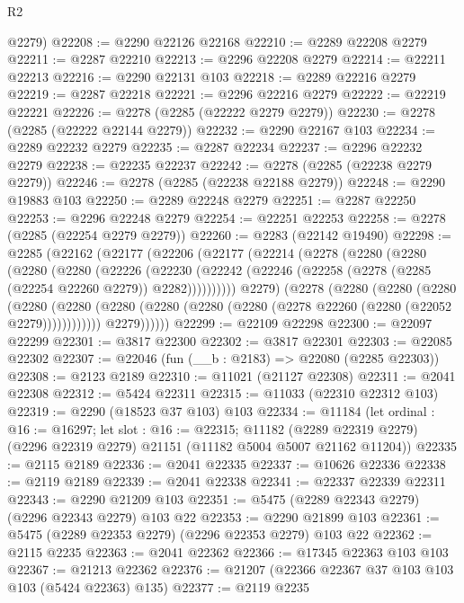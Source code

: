 \begin{lexlean}{R2}
\begin{coremodule}
      @2279)
@22208 := @2290 @22126 @22168
@22210 := @2289 @22208 @2279
@22211 := @2287 @22210
@22213 := @2296 @22208 @2279
@22214 := @22211 @22213
@22216 := @2290 @22131 @103
@22218 := @2289 @22216 @2279
@22219 := @2287 @22218
@22221 := @2296 @22216 @2279
@22222 := @22219 @22221
@22226 := @2278 (@2285 (@22222 @2279 @2279))
@22230 := @2278 (@2285 (@22222 @22144 @2279))
@22232 := @2290 @22167 @103
@22234 := @2289 @22232 @2279
@22235 := @2287 @22234
@22237 := @2296 @22232 @2279
@22238 := @22235 @22237
@22242 := @2278 (@2285 (@22238 @2279 @2279))
@22246 := @2278 (@2285 (@22238 @22188 @2279))
@22248 := @2290 @19883 @103
@22250 := @2289 @22248 @2279
@22251 := @2287 @22250
@22253 := @2296 @22248 @2279
@22254 := @22251 @22253
@22258 := @2278 (@2285 (@22254 @2279 @2279))
@22260 := @2283 (@22142 @19490)
@22298 := @2285
    (@22162
      (@22177
        (@22206
          (@22177
            (@22214
              (@2278
                (@2280
                  (@2280
                    (@2280
                      (@2280
                        (@22226
                          (@22230
                            (@22242
                              (@22246 (@22258 (@2278 (@2285 (@22254 @22260 @2279)) @2282))))))))))
                @2279)
              (@2278
                (@2280
                  (@2280
                    (@2280
                      (@2280
                        (@2280
                          (@2280 (@2280 (@2280 (@2280 (@2278 @22260 (@2280 (@22052 @2279))))))))))))
                @2279))))))
@22299 := @22109 @22298
@22300 := @22097 @22299
@22301 := @3817 @22300
@22302 := @3817 @22301
@22303 := @22085 @22302
@22307 := @22046 (fun (__b : @2183) => @22080 (@2285 @22303))
@22308 := @2123 @2189
@22310 := @11021 (@21127 @22308)
@22311 := @2041 @22308
@22312 := @5424 @22311
@22315 := @11033 (@22310 @22312 @103)
@22319 := @2290 (@18523 @37 @103) @103
@22334 := @11184
    (let ordinal : @16 := @16297;
    let slot : @16 := @22315;
    @11182 (@2289 @22319 @2279) (@2296 @22319 @2279) @21151 (@11182 @5004 @5007 @21162 @11204))
@22335 := @2115 @2189
@22336 := @2041 @22335
@22337 := @10626 @22336
@22338 := @2119 @2189
@22339 := @2041 @22338
@22341 := @22337 @22339 @22311
@22343 := @2290 @21209 @103
@22351 := @5475 (@2289 @22343 @2279) (@2296 @22343 @2279) @103 @22
@22353 := @2290 @21899 @103
@22361 := @5475 (@2289 @22353 @2279) (@2296 @22353 @2279) @103 @22
@22362 := @2115 @2235
@22363 := @2041 @22362
@22366 := @17345 @22363 @103 @103
@22367 := @21213 @22362
@22376 := @21207 (@22366 @22367 @37 @103 @103 @103 (@5424 @22363) @135)
@22377 := @2119 @2235

\end{coremodule}
\end{lexlean}
